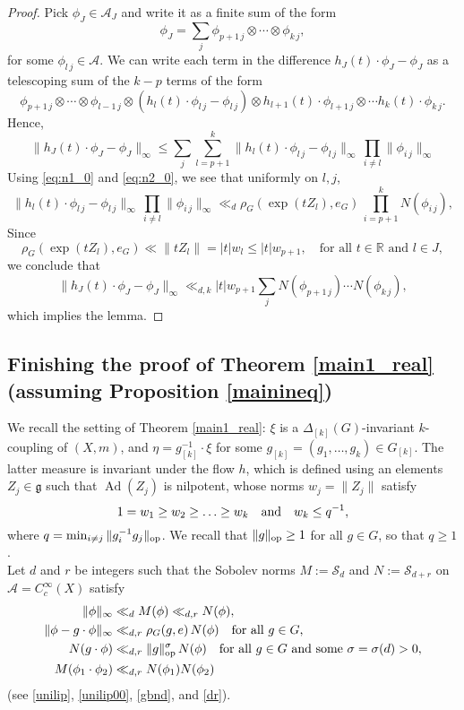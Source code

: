 \documentclass[11pt,reqno,a4paper]{amsart}
\numberwithin{equation}{section}
\newcommand{\cA}{\mathcal{A}}
\newcommand{\cS}{\mathcal{S}}
\newcommand{\gog}{\mathfrak{g}}
\DeclareMathOperator{\Ad}{Ad}
\theoremstyle{theorem}
\theoremstyle{definition}
\begin{document}
\begin{proof}
Pick $\phi_J \in \cA_J$ and write it as a finite sum of the form
\[
\phi_J = \sum_j \phi_{p+1\,j} \otimes \cdots \otimes \phi_{k\,j},
\]
for some $\phi_{l\,j} \in \cA$. We can write each term in the difference $h_J(t) \cdot \phi_J - \phi_J$ as a telescoping 
sum of the $k-p$ terms of the form
\[
\phi_{p+1\,j} \otimes \cdots \otimes \phi_{l-1\,j}\otimes (h_{l}(t) \cdot \phi_{l\,j} - \phi_{l\,j}) \otimes h_{l+1}(t) \cdot \phi_{l+1\,j} \otimes \cdots h_k(t) \cdot \phi_{k\,j}.
\]
Hence,
\[
\|h_J(t) \cdot \phi_J - \phi_J\|_\infty \leq \sum_j \sum_{l=p+1}^k \|h_l(t) \cdot \phi_{l\,j} - \phi_{l\,j}\|_\infty \, \prod_{i \neq l} \|\phi_{i\,j}\|_\infty
\]
Using \eqref{eq:n1_0} and \eqref{eq:n2_0}, we see that uniformly on $l,j$,
\[
\|h_l(t) \cdot \phi_{l\,j} - \phi_{l\,j}\|_\infty \, \prod_{i \neq l} \|\phi_{i\,j}\|_\infty
\ll_{d} \rho_G(\exp(tZ_l),e_G)
\, \prod_{i=p+1}^{k} N(\phi_{i\,j}),
\]
Since
\[
\rho_G(\exp(t Z_l),e_G) \ll \|t Z_l\| = |t|w_l \leq |t| w_{p+1}, \quad \textrm{for all $t\in \mathbb{R}$ and $l \in J$},
\]
we conclude that 
\[
\|h_J(t) \cdot \phi_J - \phi_J\|_\infty \ll_{d,k} |t| w_{p+1} \sum_j N(\phi_{p+1\,j}) \cdots N(\phi_{k\,j}),
\]
which implies the lemma.
\end{proof}

\subsection{Finishing the proof of Theorem \ref{main1_real} (assuming Proposition \ref{mainineq})} 


We recall the setting of Theorem \ref{main1_real}: $\xi$ is a $\Delta_{[k]}(G)$-invariant $k$-coupling of $(X,m)$, and 
$\eta = g_{[k]}^{-1} \cdot \xi$ for some $g_{[k]} = (g_1,\ldots,g_k) \in G_{[k]}$. The latter measure is
invariant under the flow $h$, which is defined using an elements $Z_j \in \gog$
such that $\Ad(Z_j)$ is nilpotent, 
whose norms $w_j = \|Z_j\|$ satisfy
\[
1 = w_1 \geq w_2 \geq \ldots \geq w_k \quad\hbox{and}\quad w_k\le q^{-1},
\]
where $q = \min_{i \neq j} \|g_i^{-1} g_j\|_{\rm op}$. 
We recall that $\|g\|_{\rm op}\ge 1$ for all $g\in G$, so that $q\ge 1$.\\

Let $d$ and $r$ be integers such that the Sobolev norms $M := \cS_{d}$ and $N := \cS_{d+r}$ on $\cA=C_c^\infty(X)$ satisfy
\begin{align}
\|\phi\|_\infty &\ll_d M(\phi)\ll_{d,r} N(\phi), \label{eq:n1} \\
\|\phi-g\cdot \phi\|_\infty &\ll_{d,r} \rho_G(g,e) \, N(\phi)\quad \hbox{for all $g \in G$,} \label{eq:n2}\\
N(g \cdot \phi) &\ll_{d,r} \|g\|_{\rm op}^{\sigma}\, N(\phi)\quad\hbox{for all $g\in G$ and some $\sigma =\sigma(d)> 0$},\label{eq:n3}\\
M(\phi_1 \cdot \phi_2) &\ll_{d,r} N(\phi_1) N(\phi_2) \label{eq:n4} 
\end{align}
(see \eqref{unilip}, \eqref{unilip00}, \eqref{gbnd}, and \eqref{dr}).\\
\end{document}
